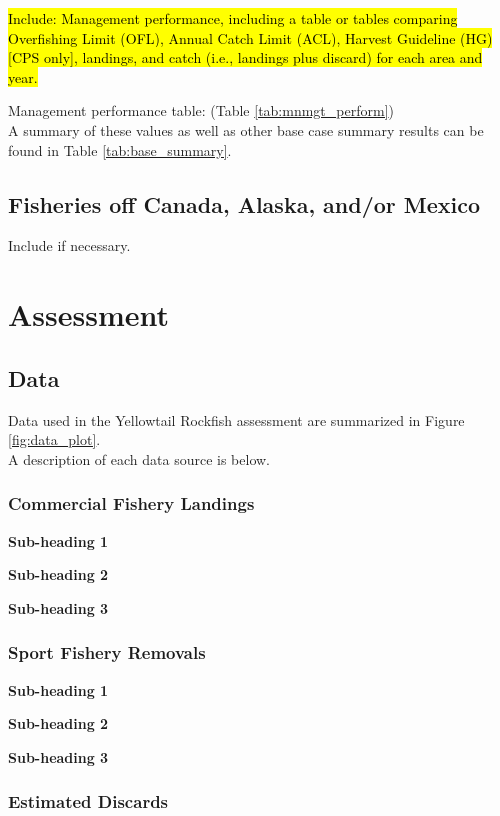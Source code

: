 \documentclass[12pt,]{article}
\begin{document}
\hl{Include: Management performance, including a table or tables comparing 
Overfishing Limit (OFL), Annual Catch Limit (ACL), Harvest Guideline (HG) 
[CPS only], landings, and catch (i.e., landings plus discard) for each area and year.}

Management performance table: (Table \ref{tab:mnmgt_perform})\\
A summary of these values as well as other base case summary results can
be found in Table \ref{tab:base_summary}.

\subsection{Fisheries off Canada, Alaska, and/or
Mexico}\label{fisheries-off-canada-alaska-andor-mexico}

Include if necessary.

\section{Assessment}\label{assessment}

\subsection{Data}\label{data}

Data used in the Yellowtail Rockfish assessment are summarized in Figure
\ref{fig:data_plot}.\\
A description of each data source is below.

\subsubsection{Commercial Fishery
Landings}\label{commercial-fishery-landings}

\textbf{Sub-heading 1}

\textbf{Sub-heading 2}

\textbf{Sub-heading 3}

\subsubsection{Sport Fishery Removals}\label{sport-fishery-removals}

\textbf{Sub-heading 1}

\textbf{Sub-heading 2}

\textbf{Sub-heading 3}

\subsubsection{Estimated Discards}\label{estimated-discards}
\end{document}
